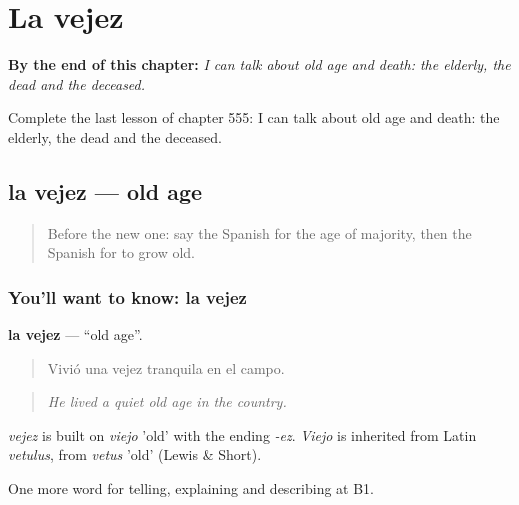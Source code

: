 
\chapter{La vejez}
\label{ch:es-la-vejez}

\begin{chapteropening}
\textbf{By the end of this chapter:} \emph{I can talk about old age and death: the elderly, the dead and the deceased.}

Complete the last lesson of chapter 555: I can talk about old age and death: the elderly, the dead and the deceased.
\end{chapteropening}

\section[la vejez]{la vejez — old age}

\label{lesson:ES-C555-vejez}



\begin{quote}
Before the new one: say the Spanish for the age of majority, then the Spanish for to grow old.
\end{quote}

\subsection*{You'll want to know: la vejez}
\textbf{la vejez} — \textquotedblleft{}old age\textquotedblright{}.

\begin{quote}
Vivió una vejez tranquila en el campo.
\end{quote}

\begin{quote}
\emph{He lived a quiet old age in the country.}
\end{quote}

\begin{cousinweb}
\emph{vejez} is built on \emph{viejo} 'old' with the ending \emph{-ez}. \emph{Viejo} is inherited from Latin \emph{vetulus}, from \emph{vetus} 'old' (Lewis \& Short).
\end{cousinweb}

\begin{grammarlens}[title={What you've built}]
One more word for telling, explaining and describing at B1.
\end{grammarlens}

